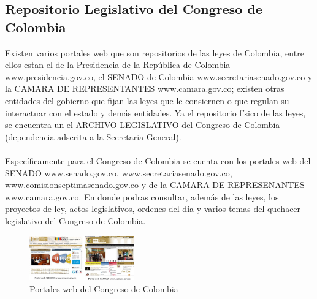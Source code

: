 \documentclass[conference]{IEEEtran}
\begin{document}
 \subsection{Repositorio Legislativo del Congreso de Colombia}
    Existen varios portales web que son repositorios de las leyes de Colombia, entre ellos estan el de la Presidencia de la República de Colombia www.presidencia.gov.co, el SENADO de Colombia www.secretariasenado.gov.co y la CAMARA DE REPRESENTANTES www.camara.gov.co; existen otras entidades del gobierno que fijan las leyes que le consiernen o que regulan su interactuar con el estado y demás entidades. Ya el repositorio físico de las leyes, se encuentra un el ARCHIVO LEGISLATIVO del Congreso de Colombia (dependencia adscrita a la Secretaria General). \\ \\    
    Específicamente para el Congreso de Colombia se cuenta con los portales web del SENADO www.senado.gov.co, www.secretariasenado.gov.co, www.comisionseptimasenado.gov.co y de la CAMARA DE REPRESENANTES www.camara.gov.co.  En donde podras consultar, además de las leyes, los proyectos de ley, actos legislativos, ordenes del dia y varios temas del quehacer legislativo del Congreso de Colombia.
    \begin{figure}[h]
    	\centering
    	\includegraphics[width=0.4\textwidth]{portales-congreso}
    	\caption{Portales web del Congreso de Colombia}
    \end{figure}
    
\end{document}
